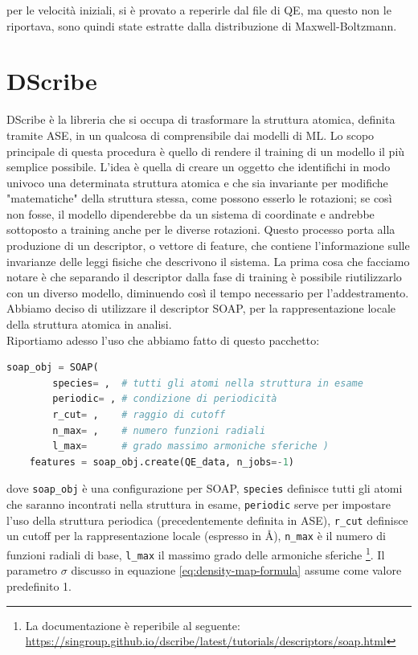 per le velocità iniziali, si è provato a reperirle dal file di QE, ma questo non le riportava, sono quindi state estratte dalla distribuzione di Maxwell-Boltzmann.


\section{DScribe} %
DScribe è la libreria \cite{dscribe-doc} che si occupa di trasformare la struttura atomica, definita tramite ASE, in un qualcosa di comprensibile dai modelli di ML. Lo scopo principale di questa procedura è quello di rendere il training di un modello il più semplice possibile. L'idea è quella di creare un oggetto che identifichi in modo univoco una determinata struttura atomica e che sia invariante per modifiche "matematiche" della struttura stessa, come possono esserlo le rotazioni; se così non fosse, il modello dipenderebbe da un sistema di coordinate e andrebbe sottoposto a training anche per le diverse rotazioni. Questo processo porta alla produzione di un descriptor, o vettore di feature, che contiene l'informazione sulle invarianze delle leggi fisiche che descrivono il sistema. La prima cosa che facciamo notare è che separando il descriptor dalla fase di training è possibile riutilizzarlo con un diverso modello, diminuendo così il tempo necessario per l'addestramento. Abbiamo deciso di utilizzare il descriptor SOAP, per la rappresentazione locale della struttura atomica in analisi. \cite{dscribe-intro,dscribe2}
\\

Riportiamo adesso l'uso che abbiamo fatto di questo pacchetto:

\begin{lstlisting}[caption={Snippet usato per la creazione delle feature tramite SOAP}, label={code:soap-dscribe}, language=Python]
    soap_obj = SOAP(
        species= ,  # tutti gli atomi nella struttura in esame
        periodic= , # condizione di periodicità    
        r_cut= ,    # raggio di cutoff
        n_max= ,    # numero funzioni radiali     
        l_max=      # grado massimo armoniche sferiche )
    features = soap_obj.create(QE_data, n_jobs=-1)
\end{lstlisting}

dove \texttt{soap\_obj} è una configurazione per SOAP, \texttt{species} definisce tutti gli atomi che saranno incontrati nella struttura in esame, \texttt{periodic} serve per impostare l'uso della struttura periodica (precedentemente definita in ASE), \texttt{r\_cut} definisce un cutoff per la rappresentazione locale (espresso in \r{A}), \texttt{n\_max} è il numero di funzioni radiali di base, \texttt{l\_max} il massimo grado delle armoniche sferiche \footnote{La documentazione è reperibile al seguente: \url{https://singroup.github.io/dscribe/latest/tutorials/descriptors/soap.html}}. Il parametro $\sigma$ discusso in equazione \eqref{eq:density-map-formula} assume come valore predefinito 1.

